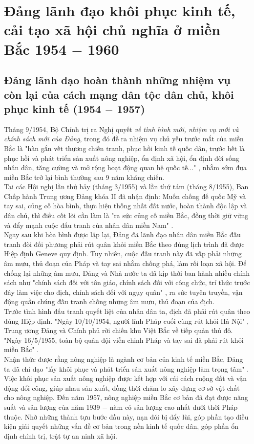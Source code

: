 \section{Đảng lãnh đạo khôi phục kinh tế, cải tạo xã hội chủ nghĩa ở miền Bắc 1954 $-$ 1960}
\subsection{Đảng lãnh đạo hoàn thành những nhiệm vụ còn lại của cách mạng dân tộc dân chủ, khôi phục kinh tế (1954 $-$ 1957)}
Tháng 9/1954, Bộ Chính trị ra Nghị quyết \textit{về tình hình mới, nhiệm vụ mới và chính sách mới của Đảng}, trong đó đề ra nhiệm vụ chủ yếu trước mắt của miền Bắc là "hàn gắn vết thương chiến tranh, phục hồi kinh tế quốc dân, trước hết là phục hồi và phát triển sản xuất nông nghiệp, ổn định xã hội, ổn định đời sống nhân dân, tăng cường và mở rộng hoạt động quan hệ quốc tế..." \supercite{giaotrinh}, nhằm sớm đưa miền Bắc trở lại bình thường sau 9 năm kháng chiến.\\
Tại các Hội nghị lần thứ bảy (tháng 3/1955) và lần thứ tám (tháng 8/1955), Ban Chấp hành Trung ương Đảng khóa II đã nhận định: Muốn chống đế quốc Mỹ và tay sai, củng cố hòa bình, thực hiện thống nhất đất nước, hoàn thành độc lập và dân chủ, thì điều cốt lõi cần làm là "ra sức củng cố miền Bắc, đồng thời giữ vững và đẩy mạnh cuộc đấu tranh của nhân dân miền Nam" \supercite{giaotrinh}.\\
Ngay sau khi hòa bình được lập lại, Đảng đã lãnh đạo nhân dân miền Bắc đấu tranh đòi đối phương phải rút quân khỏi miền Bắc theo đúng lịch trình đã được Hiệp định Geneve quy định. Tuy nhiên, cuộc đấu tranh này đã vấp phải những âm mưu, thủ đoạn của Pháp và tay sai nhằm chống phá, làm rối loạn xã hội. Để chống lại những âm mưu, Đảng và Nhà nước ta đã kịp thời ban hành nhiều chính sách như "chính sách đối với tôn giáo, chính sách đối với công chức, trí thức trước đây làm việc cho địch, chính sách đối với ngụy quân" \supercite{giaotrinh}, ra sức tuyên truyền, vận động quần chúng đấu tranh chống những âm mưu, thủ đoạn của địch.\\
Trước tình hình đấu tranh quyết liệt của nhân dân ta, địch đã phải rút quân theo đúng Hiệp định. "Ngày 10/10/1954, người lính Pháp cuối cùng rút khỏi Hà Nội" \supercite{giaotrinh}, Trung ương Đảng và Chính phủ rời chiến khu Việt Bắc về tiếp quản thủ đô. "Ngày 16/5/1955, toàn bộ quân đội viễn chinh Pháp và tay sai đã phải rút khỏi miền Bắc" \supercite{giaotrinh}.\\
Nhận thức được rằng nông nghiệp là ngành cơ bản của kinh tế miền Bắc, Đảng ta đã chỉ đạo "lấy khôi phục và phát triển sản xuất nông nghiệp làm trọng tâm" \supercite{giaotrinh}. Việc khôi phục sản xuất nông nghiệp được kết hợp với cải cách ruộng đất và vận động đổi công, giúp nhau sản xuất, đồng thời chăm lo xây dựng cơ sở vật chất cho nông nghiệp. Đến năm 1957, nông nghiệp miền Bắc cơ bản đã đạt được năng suất và sản lượng của năm 1939 $-$ năm có sản lượng cao nhất dưới thời Pháp thuộc. Nhờ những thành tựu bước đầu này, nạn đói bị đẩy lùi, góp phần tạo điều kiện giải quyết những vấn đề cơ bản trong nền kinh tế quốc dân, góp phần ổn định chính trị, trật tự an ninh xã hội.\\
